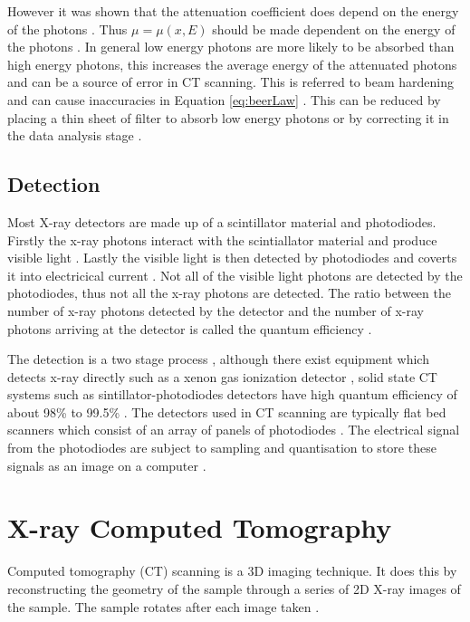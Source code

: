 \documentclass[12pt, a4paper]{memoir}
\begin{document}
However it was shown that the attenuation coefficient does depend on the energy of the photons \citep{elbakri2002statistical}. Thus $\mu=\mu(x,E)$ should be made dependent on the energy of the photons \citep{cantatore2011introduction}. In general low energy photons are more likely to be absorbed than high energy photons, this increases the average energy of the attenuated photons and can be a source of error in CT scanning. This is referred to beam hardening and can cause inaccuracies in Equation \eqref{eq:beerLaw} \citep{michael2001x}. This can be reduced by placing a thin sheet of filter to absorb low energy photons \citep{welkenhuyzen2009industrial} or by correcting it in the data analysis stage \citep{michael2001x}.

\subsection{Detection}
Most X-ray detectors are made up of a scintillator material \citep{greskovich1997ceramic} and photodiodes. Firstly the x-ray photons interact with the scintiallator material and produce visible light \citep{rossner1993conversion}. Lastly the visible light is then detected by photodiodes and coverts it into electricical current \citep{michael2001x}. Not all of the visible light photons are detected by the photodiodes, thus not all the x-ray photons are detected. The ratio between the number of x-ray photons detected by the detector and the number of x-ray photons arriving at the detector is called the quantum efficiency \citep{cierniak2011x}.

The detection is a two stage process \citep{cierniak2011x}, although there exist equipment which detects x-ray directly such as a xenon gas ionization detector \citep{fuchs2000direct}, solid state CT systems such as sintillator-photodiodes detectors have high quantum efficiency of about 98\% to 99.5\% \citep{hsieh2000investigation}. The detectors used in CT scanning are typically flat bed scanners which consist of an array of panels of photodiodes \citep{cantatore2011introduction}. The electrical signal from the photodiodes are subject to sampling and quantisation to store these signals as an image on a computer \citep{cierniak2011x}.

\section{X-ray Computed Tomography}
Computed tomography (CT) scanning is a 3D imaging technique. It does this by reconstructing the geometry of the sample through a series of 2D X-ray images of the sample. The sample rotates after each image taken \citep{cantatore2011introduction}.
\end{document}
